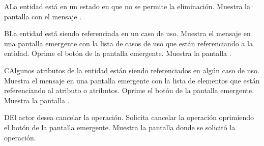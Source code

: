  \begin{UCtrayectoriaA}{A}{La entidad está en un estado en que no se permite la eliminación.}
    \UCpaso[\UCsist] Muestra la pantalla  con el mensaje .
 \end{UCtrayectoriaA} 
 \begin{UCtrayectoriaA}{B}{La entidad está siendo referenciada en un caso de uso.}
    \UCpaso[\UCsist] Muestra el mensaje  en una pantalla emergente
    con la lista de casos de uso que están referenciando a la entidad.
    \UCpaso[\UCactor] Oprime el botón  de la pantalla emergente.
    \UCpaso[\UCsist] Muestra la pantalla .
 \end{UCtrayectoriaA}
 \begin{UCtrayectoriaA}{C}{Algunos atributos de la entidad están siendo referenciados en algún caso de uso.}
    \UCpaso[\UCsist] Muestra el mensaje  en una pantalla emergente
    con la lista de elementos que están referenciando al atributo o atributos.
    \UCpaso[\UCactor] Oprime el botón  de la pantalla emergente.
    \UCpaso[\UCsist] Muestra la pantalla .
 \end{UCtrayectoriaA}
 \begin{UCtrayectoriaA}{D}{El actor desea cancelar la operación.}
    \UCpaso[\UCactor] Solicita cancelar la operación oprimiendo el botón  de la pantalla emergente.
    \UCpaso[\UCsist] Muestra la pantalla donde se solicitó la operación.
 \end{UCtrayectoriaA} 